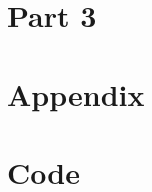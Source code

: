 \documentclass{article}
\begin{document}
\section{Part 3}

\section*{Appendix}
\appendix

\newpage
\section{Code}\label{appendix:code}






\end{document}
